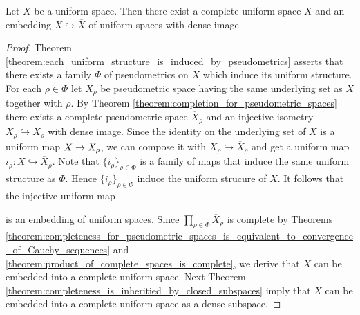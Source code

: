 \documentclass[10pt]{amsart}
\begin{document}
\begin{theorem}\label{theorem:completion_for_uniform_spaces}
	Let $X$ be a uniform space. Then there exist a complete uniform space $\overline{X}$ and an embedding $X \hookrightarrow \overline{X}$ of uniform spaces with dense image.
\end{theorem}
\begin{proof}
	Theorem \ref{theorem:each_uniform_structure_is_induced_by_pseudometrics} asserts that there exists a family $\Phi$ of pseudometrics on $X$ which induce its uniform structure. For each $\rho \in \Phi$ let $X_{\rho}$ be pseudometric space having the same underlying set as $X$ together with $\rho$. By Theorem \ref{theorem:completion_for_pseudometric_spaces} there exists a complete pseudometric space $\overline{X}_{\rho}$ and an injective isometry $X_{\rho} \hookrightarrow \overline{X}_{\rho}$ with dense image. Since the identity on the underlying set of $X$ is a uniform map $X \rightarrow X_{\rho}$, we can compose it with $X_{\rho} \hookrightarrow \overline{X}_{\rho}$ and get a uniform map $i_{\rho}:X \hookrightarrow \overline{X}_{\rho}$. Note that $\{i_{\rho}\}_{\rho\in \Phi}$ is a family of maps that induce the same uniform structure as $\Phi$. Hence $\{i_{\rho}\}_{\rho \in \Phi}$ induce the uniform strucure of $X$. It follows that the injective uniform map
	\begin{center}
	\end{center}
	is an embedding of uniform spaces. Since $\prod_{\rho \in \Phi}\overline{X}_{\rho}$ is complete by Theorems \ref{theorem:completeness_for_pseudometric_spaces_is_equivalent_to_convergence_of_Cauchy_sequences} and \ref{theorem:product_of_complete_spaces_is_complete}, we derive that $X$ can be embedded into a complete uniform space. Next Theorem \ref{theorem:completeness_is_inheritied_by_closed_subspaces} imply that $X$ can be embedded into a complete uniform space as a dense subspace.
\end{proof}
\end{document}
